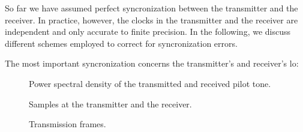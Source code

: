 
So far we have assumed perfect syncronization between the transmitter and the receiver.
In practice, however, the clocks in the transmitter and the receiver are independent and only accurate to finite precision.
In the following, we discuss different schemes employed to correct for syncronization errors.

The most important syncronization concerns the transmitter's and receiver's \gls{lo}:
\begin{figure}[htb]
	\centering
	
	\caption{Power spectral density of the transmitted and received pilot tone.}
\end{figure}
\begin{figure}[htb]
	\centering
	
	\caption{Samples at the transmitter and the receiver.}
\end{figure}

\begin{figure}[htb]
	\centering
	
	\caption{Transmission frames.}
\end{figure}
